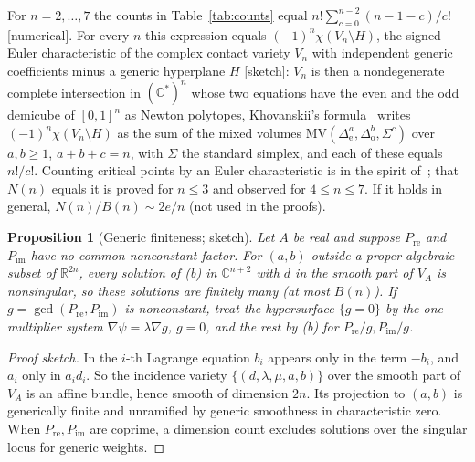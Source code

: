 \documentclass[11pt,a4paper]{article}
\theoremstyle{plain}
\newtheorem{proposition}[theorem]{Proposition}
\theoremstyle{definition}
\newcommand{\R}{\mathbb{R}}
\newcommand{\C}{\mathbb{C}}
\newcommand{\Pre}{P_{\mathrm{re}}}
\newcommand{\Pim}{P_{\mathrm{im}}}
\begin{document}
\begin{table}[h]
\centering\small
\caption{B\'ezout numbers $B(n)$ (exact) and generic numbers $N(n)$ of complex solutions of system (b)
(monodromy with random complex parameters, cross-checked by a linear-product homotopy for $n\le6$;
numerical).}\label{tab:counts}

\end{table}

For $n=2,\dots,7$ the counts in Table~\ref{tab:counts} equal $n!\sum_{c=0}^{n-2}(n-1-c)/c!$ [numerical]. For every
$n$ this expression equals $(-1)^n\chi(V_n\setminus H)$, the signed Euler characteristic of the complex contact
variety $V_n$ with independent generic coefficients minus a generic hyperplane $H$ [sketch]: $V_n$ is then a
nondegenerate complete intersection in $(\C^{*})^n$ whose two equations have the even and the odd demicube of
$[0,1]^n$ as Newton polytopes, Khovanskii's formula~\cite{Khovanskii1978} writes $(-1)^n\chi(V_n\setminus H)$ as the
sum of the mixed volumes $\mathrm{MV}(\Delta_{\mathrm e}^a,\Delta_{\mathrm o}^b,\Sigma^c)$ over $a,b\ge1$, $a+b+c=n$,
with $\Sigma$ the standard simplex, and each of these equals $n!/c!$. Counting critical points by an Euler
characteristic is in the spirit of~\cite{Huh2013}; that $N(n)$ equals it is proved for $n\le3$ and observed for
$4\le n\le7$. If it holds in general, $N(n)/B(n)\sim2e/n$ (not used in the proofs).

\begin{proposition}[Generic finiteness; sketch]\label{prop:fin}
Let $A$ be real and suppose $\Pre$ and $\Pim$ have no common nonconstant factor. For $(a,b)$ outside a proper
algebraic subset of $\R^{2n}$, every solution of (b) in $\C^{n+2}$ with $d$ in the smooth part of $V_A$ is
nonsingular, so these solutions are finitely many (at most $B(n)$). If $g=\gcd(\Pre,\Pim)$ is nonconstant, treat
the hypersurface $\{g=0\}$ by the one-multiplier system $\nabla\psi=\lambda\nabla g$, $g=0$, and the rest by (b) for
$\Pre/g,\Pim/g$.
\end{proposition}

\begin{proof}[Proof sketch]
In the $i$-th Lagrange equation $b_i$ appears only in the term $-b_i$, and $a_i$ only in $a_id_i$. So the
incidence variety $\{(d,\lambda,\mu,a,b)\}$ over the smooth part of $V_A$ is an affine bundle, hence smooth of
dimension $2n$. Its projection to $(a,b)$ is generically finite and unramified by generic smoothness in
characteristic zero. When $\Pre,\Pim$ are coprime, a dimension count excludes solutions over the singular locus
for generic weights.
\end{proof}
\end{document}
